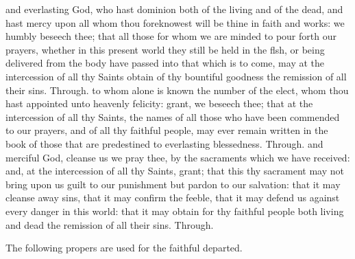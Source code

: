 \begin{multicols}{2}
 and everlasting God, who hast dominion both of the living and of the dead, and hast mercy upon all whom thou foreknowest will be thine in faith and works: we humbly beseech thee; that all those for whom we are minded to pour forth our prayers, whether in this present world they still be held in the flsh, or being delivered from the body have passed into that which is to come, may at the intercession of all thy Saints obtain of thy bountiful goodness the remission of all their sins. Through.
 to whom alone is known the number of the elect, whom thou hast appointed unto heavenly felicity: grant, we beseech thee; that at the intercession of all thy Saints, the names of all those who have been commended to our prayers, and of all thy faithful people, may ever remain written in the book of those that are predestined to everlasting blessedness. Through.
 and merciful God, cleanse us we pray thee, by the sacraments which we have received: and, at the intercession of all thy Saints, grant; that this thy sacrament may not bring upon us guilt to our punishment but pardon to our salvation: that it may cleanse away sins, that it may confirm the feeble, that it may defend us against every danger in this world: that it may obtain for thy
faithful people both living and dead the remission of all their sins. Through.
\end{multicols}

\begin{rubric}
    The following propers are used for the faithful departed.
\end{rubric}

